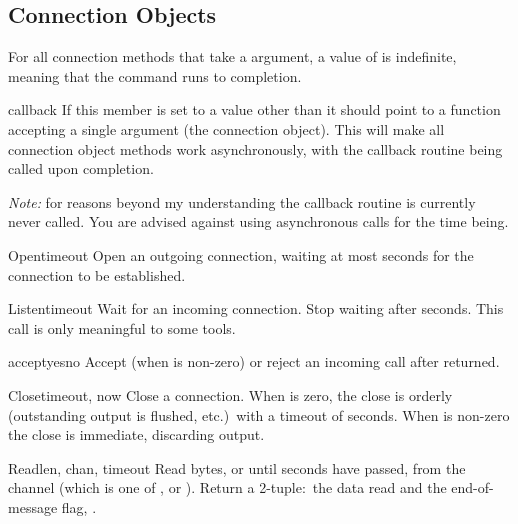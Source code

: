\subsection{Connection Objects \label{connection-object}}

For all connection methods that take a  argument, a value
of  is indefinite, meaning that the command runs to completion.

\begin{memberdesc}[connection]{callback}
If this member is set to a value other than  it should point
to a function accepting a single argument (the connection
object). This will make all connection object methods work
asynchronously, with the callback routine being called upon
completion.

\emph{Note:} for reasons beyond my understanding the callback routine
is currently never called. You are advised against using asynchronous
calls for the time being.
\end{memberdesc}


\begin{methoddesc}[connection]{Open}{timeout}
Open an outgoing connection, waiting at most  seconds for
the connection to be established.
\end{methoddesc}

\begin{methoddesc}[connection]{Listen}{timeout}
Wait for an incoming connection. Stop waiting after 
seconds. This call is only meaningful to some tools.
\end{methoddesc}

\begin{methoddesc}[connection]{accept}{yesno}
Accept (when  is non-zero) or reject an incoming call after
 returned.
\end{methoddesc}

\begin{methoddesc}[connection]{Close}{timeout, now}
Close a connection. When  is zero, the close is orderly
(outstanding output is flushed, etc.)\ with a timeout of
 seconds. When  is non-zero the close is
immediate, discarding output.
\end{methoddesc}

\begin{methoddesc}[connection]{Read}{len, chan, timeout}
Read  bytes, or until  seconds have passed, from 
the channel  (which is one of ,
 or ). Return a 2-tuple:\ the data
read and the end-of-message flag, .
\end{methoddesc}

